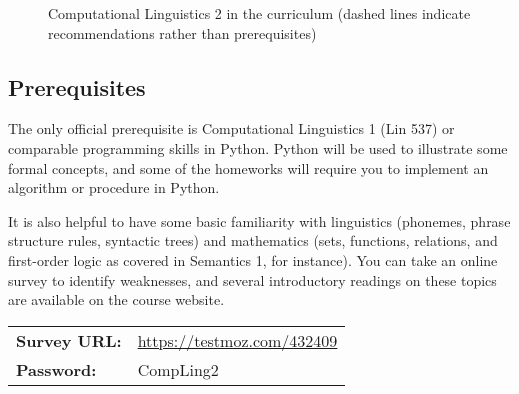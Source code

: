 \begin{figure}
\caption{Computational Linguistics 2 in the curriculum (dashed lines indicate recommendations rather than prerequisites)}
\label{fig:Syllabus_Program}
\end{figure}    

\subsection{Prerequisites}

The only official prerequisite is Computational Linguistics 1 (Lin 537) or comparable programming skills in Python.
Python will be used to illustrate some formal concepts, and some of the homeworks will require you to implement an algorithm or procedure in Python.

It is also helpful to have some basic familiarity with linguistics (phonemes, phrase structure rules, syntactic trees) and mathematics (sets, functions, relations, and first-order logic as covered in Semantics 1, for instance).
You can take an online survey to identify weaknesses, and several introductory readings on these topics are available on the course website.

\medskip
\noindent
\hspace{-.75em}
\begin{tabular}{ll}
    \textbf{Survey URL:} & 
    \href{https://testmoz.com/432409}{https://testmoz.com/432409}\\
    \textbf{Password:} &
    CompLing2
\end{tabular}

